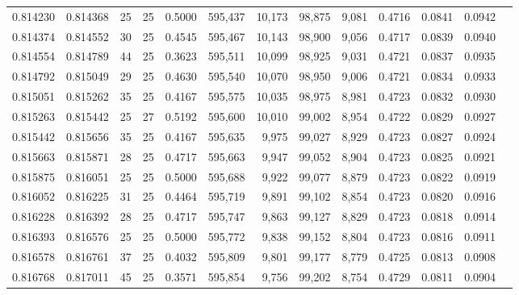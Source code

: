 \begin{tabular}{rrrrrrrrrrrrr}
0.814230 & 0.814368 &    25 &  25 &                                     0.5000 & 595,437 &  10,173 &  98,875 &   9,081 & 0.4716 & 0.0841 & 0.0942 \\
0.814374 & 0.814552 &    30 &  25 &                                     0.4545 & 595,467 &  10,143 &  98,900 &   9,056 & 0.4717 & 0.0839 & 0.0940 \\
0.814554 & 0.814789 &    44 &  25 &                                     0.3623 & 595,511 &  10,099 &  98,925 &   9,031 & 0.4721 & 0.0837 & 0.0935 \\
0.814792 & 0.815049 &    29 &  25 &                                     0.4630 & 595,540 &  10,070 &  98,950 &   9,006 & 0.4721 & 0.0834 & 0.0933 \\
0.815051 & 0.815262 &    35 &  25 &                                     0.4167 & 595,575 &  10,035 &  98,975 &   8,981 & 0.4723 & 0.0832 & 0.0930 \\
0.815263 & 0.815442 &    25 &  27 &                                     0.5192 & 595,600 &  10,010 &  99,002 &   8,954 & 0.4722 & 0.0829 & 0.0927 \\
0.815442 & 0.815656 &    35 &  25 &                                     0.4167 & 595,635 &   9,975 &  99,027 &   8,929 & 0.4723 & 0.0827 & 0.0924 \\
0.815663 & 0.815871 &    28 &  25 &                                     0.4717 & 595,663 &   9,947 &  99,052 &   8,904 & 0.4723 & 0.0825 & 0.0921 \\
0.815875 & 0.816051 &    25 &  25 &                                     0.5000 & 595,688 &   9,922 &  99,077 &   8,879 & 0.4723 & 0.0822 & 0.0919 \\
0.816052 & 0.816225 &    31 &  25 &                                     0.4464 & 595,719 &   9,891 &  99,102 &   8,854 & 0.4723 & 0.0820 & 0.0916 \\
0.816228 & 0.816392 &    28 &  25 &                                     0.4717 & 595,747 &   9,863 &  99,127 &   8,829 & 0.4723 & 0.0818 & 0.0914 \\
0.816393 & 0.816576 &    25 &  25 &                                     0.5000 & 595,772 &   9,838 &  99,152 &   8,804 & 0.4723 & 0.0816 & 0.0911 \\
0.816578 & 0.816761 &    37 &  25 &                                     0.4032 & 595,809 &   9,801 &  99,177 &   8,779 & 0.4725 & 0.0813 & 0.0908 \\
0.816768 & 0.817011 &    45 &  25 &                                     0.3571 & 595,854 &   9,756 &  99,202 &   8,754 & 0.4729 & 0.0811 & 0.0904 \\

\end{tabular}
